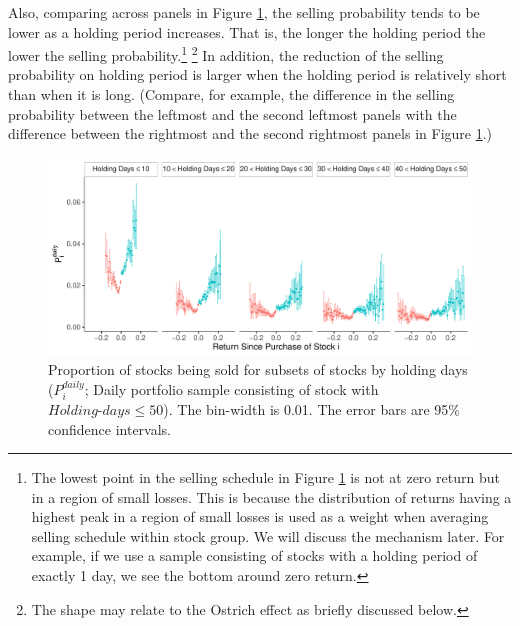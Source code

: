 \documentclass[11pt, a4paper]{article}
\begin{document}
Also, comparing across panels in Figure \ref{figure:prop_by_days_less50}, the selling probability tends to be lower as a holding period increases. That is, the longer the holding period the lower the selling probability.\footnote{The lowest point in the selling schedule in Figure \ref{figure:prop_by_days_less50} is not at zero return but in a region of small losses. This is because the distribution of returns having a highest peak in a region of small losses is used as a weight when averaging selling schedule within stock group. We will discuss the mechanism later. For example, if we use a sample consisting of stocks with a holding period of exactly 1 day, we see the bottom around zero return.} \footnote{The shape may relate to the Ostrich effect as briefly discussed below.} In addition, the reduction of the selling probability on holding period is larger when the holding period is relatively short than when it is long. (Compare, for example, the difference in the selling probability between the leftmost and the second leftmost panels with the difference between the rightmost and the second rightmost panels in Figure \ref{figure:prop_by_days_less50}.)

\begin{figure}[H]
	\centering
	\includegraphics[width=1\columnwidth]{barc_schedule_daily_by_days_less50_3.pdf}
	\caption{\small Proportion of stocks being sold for subsets of stocks by holding days ($P^{daily}_{i}$; Daily portfolio sample consisting of stock with $Holding\mbox{-}days\leq50$). The bin-width is 0.01. The error bars are 95\% confidence intervals.}
	\label{figure:prop_by_days_less50}
\end{figure}
\end{document}
